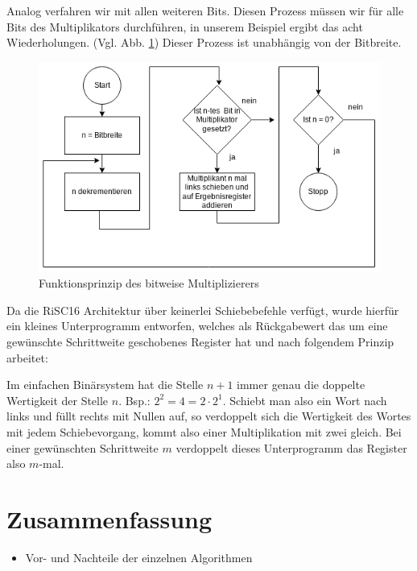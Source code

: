 \documentclass[fleqn, a4paper, 1pt]{article}       %
\begin{document}
Analog verfahren wir mit allen weiteren Bits. Diesen Prozess müssen wir für alle Bits des Multiplikators durchführen, in unserem Beispiel ergibt das acht Wiederholungen. (Vgl. Abb. \ref{fig:bitw_Mul_Prinzip}) Dieser Prozess ist unabhängig von der Bitbreite.



\begin{figure}[h]
    \includegraphics[width =1\textwidth]{bitweise_Mul_Prinzip.png}
\caption{Funktionsprinzip des bitweise Multiplizierers}
\label{fig:bitw_Mul_Prinzip}
\end{figure}



Da die RiSC16 Architektur über keinerlei Schiebebefehle verfügt, wurde hierfür ein kleines Unterprogramm entworfen, welches als Rückgabewert das um eine gewünschte Schrittweite geschobenes Register hat und nach folgendem Prinzip arbeitet:

Im einfachen Binärsystem hat die Stelle $n+1$ immer genau die doppelte Wertigkeit der Stelle $n$. Bsp.: $2^2 = 4 = 2 \cdot 2^1$. Schiebt man also ein Wort nach links und füllt rechts mit Nullen auf, so verdoppelt sich die Wertigkeit des Wortes mit jedem Schiebevorgang, kommt also einer Multiplikation mit zwei gleich. Bei einer gewünschten Schrittweite $m$ verdoppelt dieses Unterprogramm das Register also $m$-mal.


\section{Zusammenfassung}

\begin{itemize}
    \item Vor- und Nachteile der einzelnen Algorithmen
\end{itemize}
\end{document}
